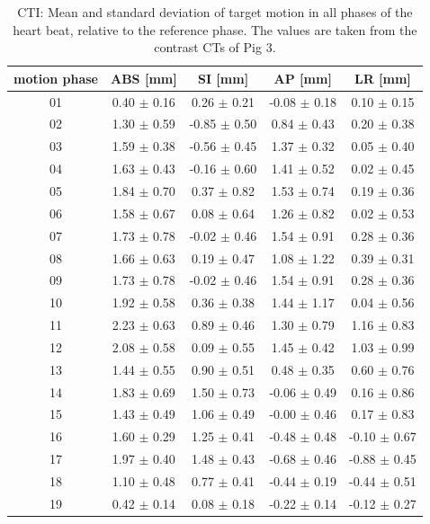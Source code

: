 \documentclass[type=dr, dr=rernat, accentcolor=tud7b,colorbacktitle, bigchapter, openright, twoside, 12pt ]{tudthesis}
\begin{document}
\begin{table}[htbp]
  \centering
    \tiny
  \caption{CTI: Mean and standard deviation of target motion in all phases of the heart beat, relative to the reference phase. The values are 
  taken from the contrast CTs of Pig 3.}
  \begin{tabular}{|c|c|c|c|c|}
    \hline\hline
    motion phase\rule{0pt}{2.6ex}\rule[-1.2ex]{0pt}{0pt} & ABS [mm] & SI [mm] & AP [mm] & LR [mm]\\
    \hline
01 &0.40 $\pm$ 0.16 &0.26 $\pm$ 0.21 &-0.08 $\pm$ 0.18 &0.10 $\pm$ 0.15 \\
02 &1.30 $\pm$ 0.59 &-0.85 $\pm$ 0.50 &0.84 $\pm$ 0.43 &0.20 $\pm$ 0.38 \\
03 &1.59 $\pm$ 0.38 &-0.56 $\pm$ 0.45 &1.37 $\pm$ 0.32 &0.05 $\pm$ 0.40 \\
04 &1.63 $\pm$ 0.43 &-0.16 $\pm$ 0.60 &1.41 $\pm$ 0.52 &0.02 $\pm$ 0.45 \\
05 &1.84 $\pm$ 0.70 &0.37 $\pm$ 0.82 &1.53 $\pm$ 0.74 &0.19 $\pm$ 0.36 \\
06 &1.58 $\pm$ 0.67 &0.08 $\pm$ 0.64 &1.26 $\pm$ 0.82 &0.02 $\pm$ 0.53 \\
07 &1.73 $\pm$ 0.78 &-0.02 $\pm$ 0.46 &1.54 $\pm$ 0.91 &0.28 $\pm$ 0.36 \\
08 &1.66 $\pm$ 0.63 &0.19 $\pm$ 0.47 &1.08 $\pm$ 1.22 &0.39 $\pm$ 0.31 \\
09 &1.73 $\pm$ 0.78 &-0.02 $\pm$ 0.46 &1.54 $\pm$ 0.91 &0.28 $\pm$ 0.36 \\
10 &1.92 $\pm$ 0.58 &0.36 $\pm$ 0.38 &1.44 $\pm$ 1.17 &0.04 $\pm$ 0.56 \\
11 &2.23 $\pm$ 0.63 &0.89 $\pm$ 0.46 &1.30 $\pm$ 0.79 &1.16 $\pm$ 0.83 \\
12 &2.08 $\pm$ 0.58 &0.09 $\pm$ 0.55 &1.45 $\pm$ 0.42 &1.03 $\pm$ 0.99 \\
13 &1.44 $\pm$ 0.55 &0.90 $\pm$ 0.51 &0.48 $\pm$ 0.35 &0.60 $\pm$ 0.76 \\
14 &1.83 $\pm$ 0.69 &1.50 $\pm$ 0.73 &-0.06 $\pm$ 0.49 &0.16 $\pm$ 0.86 \\
15 &1.43 $\pm$ 0.49 &1.06 $\pm$ 0.49 &-0.00 $\pm$ 0.46 &0.17 $\pm$ 0.83 \\
16 &1.60 $\pm$ 0.29 &1.25 $\pm$ 0.41 &-0.48 $\pm$ 0.48 &-0.10 $\pm$ 0.67 \\
17 &1.97 $\pm$ 0.40 &1.48 $\pm$ 0.43 &-0.68 $\pm$ 0.46 &-0.88 $\pm$ 0.45 \\
18 &1.10 $\pm$ 0.48 &0.77 $\pm$ 0.41 &-0.44 $\pm$ 0.19 &-0.44 $\pm$ 0.51 \\
19 &0.42 $\pm$ 0.14 &0.08 $\pm$ 0.18 &-0.22 $\pm$ 0.14 &-0.12 $\pm$ 0.27 \\
    \hline\hline
  \end{tabular}
  \label{tab:motion:CTI:Pig3}
\end{table}
\end{document}

